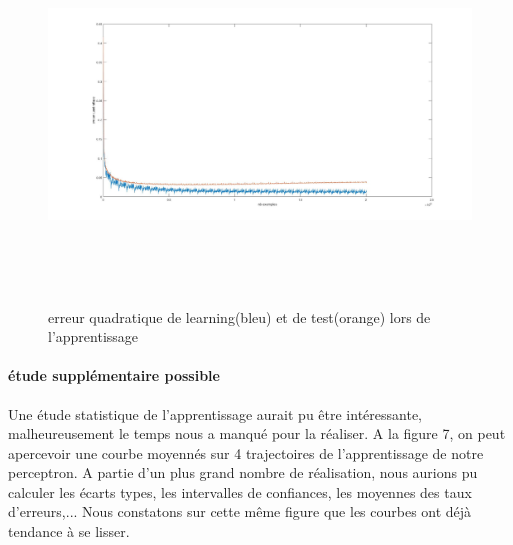 \documentclass[a4paper,oneside]{report}
\begin{document}
\begin{figure}[!h]
	\begin{center}
		\includegraphics[width=17cm,height=10cm]{Images/courbes3couches50_quaderror.jpg} 
		\caption{erreur quadratique de learning(bleu) et de test(orange) lors de l'apprentissage}  
	\end{center}
\end{figure}

\paragraph{étude supplémentaire possible}

Une étude statistique de l'apprentissage aurait pu être intéressante, malheureusement le temps nous a manqué pour la réaliser. A la figure 7, on peut apercevoir une courbe moyennés sur 4 trajectoires de l'apprentissage de notre perceptron. A partie d'un plus grand nombre de réalisation, nous aurions pu calculer les écarts types, les intervalles de confiances, les moyennes des taux d'erreurs,... Nous constatons sur cette même figure que les courbes ont déjà tendance à se lisser.
\end{document}
